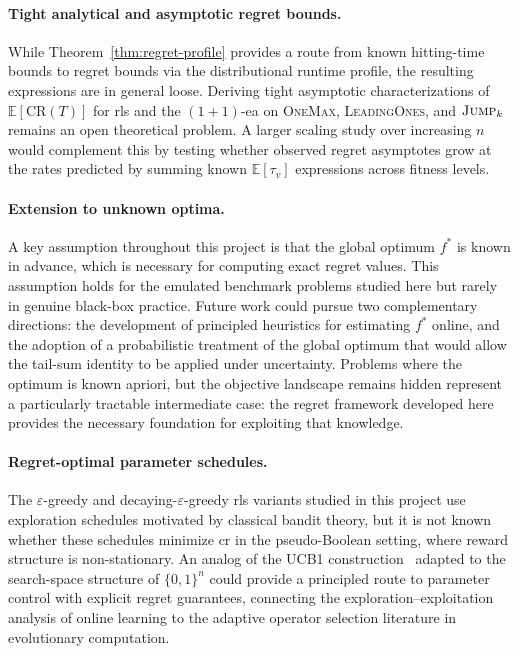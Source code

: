 \paragraph{Tight analytical and asymptotic regret bounds.}
While Theorem~\ref{thm:regret-profile} provides a route from known
hitting-time bounds to regret bounds via the distributional runtime
profile, the resulting expressions are in general loose. Deriving
tight asymptotic characterizations of $\mathbb{E}[\mathrm{CR}(T)]$ for
\acrshort{rls} and the $(1+1)$-\acrshort{ea} on
\textsc{OneMax}, \textsc{LeadingOnes}, and $\textsc{Jump}_k$ remains an
open theoretical problem. A larger scaling study over increasing $n$
would complement this by testing whether observed regret asymptotes
grow at the rates predicted by summing known $\mathbb{E}[\tau_v]$
expressions across fitness levels.

\paragraph{Extension to unknown optima.}
A key assumption throughout this project is that the global optimum
$f^*$ is known in advance, which is necessary for computing exact
regret values. This assumption holds for the emulated benchmark
problems studied here but rarely in genuine black-box practice. Future
work could pursue two complementary directions: the development of
principled heuristics for estimating $f^*$ online, and the adoption of
a probabilistic treatment of the global optimum that would allow the
tail-sum identity to be applied under uncertainty. Problems where the
optimum is known apriori, but the objective landscape remains hidden
represent a particularly tractable intermediate case: the regret
framework developed here provides the necessary foundation for
exploiting that knowledge.

\paragraph{Regret-optimal parameter schedules.}
The $\varepsilon$-greedy and decaying-$\varepsilon$-greedy
\acrshort{rls} variants studied in this project use exploration
schedules motivated by classical bandit theory, but it is not known
whether these schedules minimize \acrshort{cr} in the
pseudo-Boolean setting, where reward structure is non-stationary.
An analog of the UCB1 construction~\cite{auer2002finite} adapted to
the search-space structure of $\{0,1\}^n$ could provide a principled
route to parameter control with explicit regret guarantees, connecting
the exploration--exploitation analysis of online learning to the
adaptive operator selection literature in evolutionary computation.


